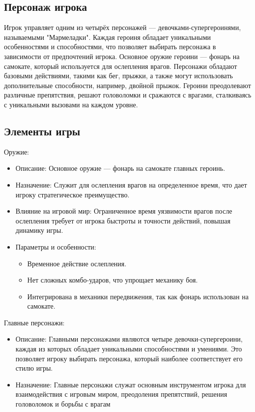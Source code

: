 \documentclass[article,12pt, fleqn]{article}
\begin{document}
\begin{itemize}
\subsection{Персонаж игрока}
Игрок управляет одним из четырёх персонажей — девочками-супергероинями, называемыми "Мармеладки". Каждая героиня обладает уникальными особенностями и способностями, что позволяет выбирать персонажа в зависимости от предпочтений игрока. Основное оружие героини — фонарь на самокате, который используется для ослепления врагов. Персонажи обладают базовыми действиями, такими как бег, прыжки, а также могут использовать дополнительные способности, например, двойной прыжок. Героини преодолевают различные препятствия, решают головоломки и сражаются с врагами, сталкиваясь с уникальными вызовами на каждом уровне.

\subsection{Элементы игры}
Оружие: 
    \begin{itemize}
        \item Описание: Основное оружие — фонарь на самокате главных героинь.
        \item Назначение: Служит для ослепления врагов на определенное время, что дает игроку стратегическое преимущество.
        \item Влияние на игровой мир: Ограниченное время уязвимости врагов после ослепления требует от игрока быстроты и точности действий, повышая динамику игры.
        \item Параметры и особенности: 
        \begin{itemize}
            \item Временное действие ослепления.
            \item Нет сложных комбо-ударов, что упрощает механику боя.
            \item Интегрирована в механики передвижения, так как фонарь использован на самокате.
        \end{itemize}
    \end{itemize}
Главные персонажи: 
    \begin{itemize}
        \item Описание: Главными персонажами являются четыре девочки-супергероини, каждая из которых обладает уникальными способностями и умениями. Это позволяет игроку выбирать персонажа, который наиболее соответствует его стилю игры.
        \item Назначение: Главные персонажи служат основным инструментом игрока для взаимодействия с игровым миром, преодоления препятствий, решения головоломок и борьбы с врагам

\end{itemize}
\end{itemize}
\end{document}
